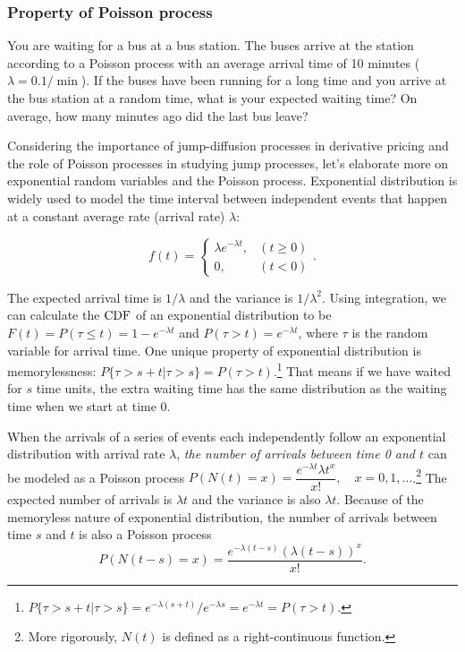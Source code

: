 \subsubsection{Property of Poisson process}

\begin{problem}{You are waiting for a bus at a bus station. The buses arrive at the station according to a Poisson process with an average arrival time of 10 minutes ($\lambda=0.1/\min$). If the buses have been running for a long time and you arrive at the bus station at a random time, what is your expected waiting time? On average, how many minutes ago did the last bus leave?}

\end{problem}
\begin{solution}
Considering the importance of jump-diffusion processes in derivative pricing and the
role of Poisson processes in studying jump processes, let's elaborate more on
exponential random variables and the Poisson process. Exponential distribution is widely
used to model the time interval between independent events that happen at a constant
average rate (arrival rate) $\lambda$:

\[
f(t)=
\begin{cases}
\lambda e^{-\lambda t}, & (t\ge 0)\\
0, & (t<0)
\end{cases}.
\]

The expected arrival time is $1/\lambda$ and the variance is $1/\lambda^2$. Using
integration, we can calculate the \(\mathrm{CDF}\) of an exponential distribution to be
$F(t)=P(\tau\le t)=1-e^{-\lambda t}$ and $P(\tau>t)=e^{-\lambda t}$, where $\tau$ is
the random variable for arrival time. One unique property of exponential distribution is
memorylessness: $P\{\tau>s+t\vert\tau>s\}=P(\tau>t)$.\footnote[23]{$P\{\tau>s+t\vert\tau>s\}=e^{-\lambda(s+t)}/e^{-\lambda s}=e^{-\lambda t}=P(\tau>t)$.}
That means if we have waited for $s$ time units, the extra waiting time has the same
distribution as the waiting time when we start at time 0.

When the arrivals of a series of events each independently follow an exponential
distribution with arrival rate $\lambda$, \emph{the number of arrivals between time 0 and
$t$} can be modeled as a Poisson process
$P(N(t)=x)=\dfrac{e^{-\lambda t}\lambda t^x}{x!},\quad x=0,1,\ldots$.\footnote[24]{More rigorously, $N(t)$ is defined as a right-continuous function.}
The expected number of arrivals is $\lambda t$ and the variance is also $\lambda t$.
Because of the memoryless nature of exponential distribution, the number of arrivals
between time $s$ and $t$ is also a Poisson process
\[
P(N(t-s)=x)=\frac{e^{-\lambda(t-s)}\left(\lambda(t-s)\right)^x}{x!}.
\]


\end{solution}
